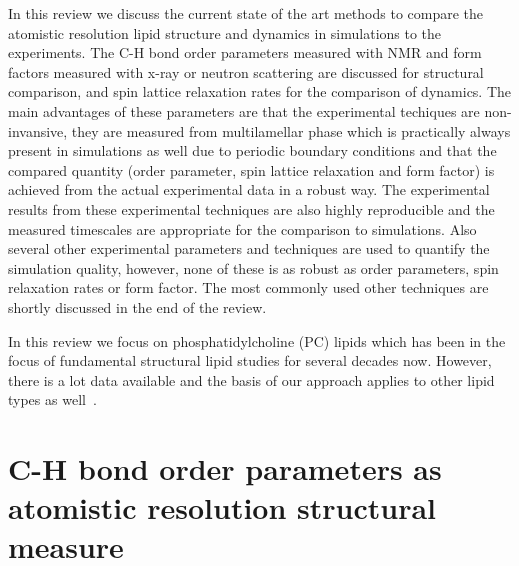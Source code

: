 \documentclass[aps,prl,superscriptaddress,twocolumn]{revtex4}
\begin{document}
In this review we discuss the current state of the art methods to compare the 
atomistic resolution lipid structure and dynamics in simulations to the experiments. 
The C-H bond order parameters measured with NMR and form factors measured
with x-ray or neutron scattering are discussed for structural comparison,
and spin lattice relaxation rates for the comparison of dynamics.
The main advantages of these parameters are that
the experimental techiques are non-invansive, they are measured from multilamellar phase 
which is practically always present in simulations as well due to periodic boundary conditions
and that the compared quantity (order parameter, spin lattice relaxation and form factor) is achieved from 
the actual experimental data in a robust way. The experimental results from these
experimental techniques are also highly reproducible and the measured timescales
are appropriate for the comparison to simulations. Also several other experimental
parameters and techniques are used to quantify the simulation quality, however,
none of these is as robust as order parameters, spin relaxation rates or form factor. The most
commonly used other techniques are shortly discussed in the end of the review.

In this review we focus on phosphatidylcholine (PC) lipids which has been
in the focus of fundamental structural lipid studies for several decades now. However, there is a lot
data available and the basis of our approach applies to other lipid types as well~\cite{??}.

\section{C-H bond order parameters as atomistic resolution structural measure}



\end{document}

